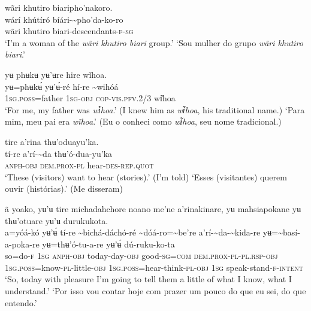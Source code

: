 \documentclass[output=paper,
modfonts,nonflat
]{langsci/langscibook}
\begin{document}
\ea wãri khutiro biaripho'nakoro. \\[.3em]
\gll {\textasciitilde}wárí khútíró bíári-{\textasciitilde}pho'da-ko-ro \\
     wãri khutiro biari-descendants\textsc{-f-sg} \\
\glt ‘I'm a woman of the \textit{wãri khutiro biari} group.’
\glt ‘Sou mulher do grupo \textit{wãri khutiro biari}.’
\z 

\ea yʉ phʉkʉ yʉ’ʉre hire wĩhoa. \\[.3em]
\gll yʉ=phʉkʉ́	yʉ’ʉ́-ré	hí-re	{\textasciitilde}wihóá\\
     1\textsc{sg.poss}=father	1\textsc{sg}\textsc{-obj}  	\textsc{cop-}\textsc{vis.pfv.}2/3	wi͂hoa \\
\glt ‘For me, my father was \textit{wi͂hoa}.’ (I knew him as \textit{wi͂hoa}, his traditional name.)
\glt ‘Para mim, meu pai era \textit{wĩhoa}.’ (Eu o conheci como \textit{wi͂hoa}, seu nome tradicional.)
\z 
 
\ea tire a’rina thʉ'oduayu'ka. \\[.3em]
\gll tí-re	a’rí-{\textasciitilde}da	thʉ'ó-dua-yu'ka \\
     \textsc{anph-obj}  	\textsc{dem.prox-pl}	hear-\textsc{des-rep.quot} \\
\glt ‘These (visitors) want to hear (stories).’ (I’m told)
\glt ‘Esses (visitantes) querem ouvir (histórias).’ (Me disseram)
\z 

\ea ã yoako, yʉ’ʉ tire michadahchore noano me'ne a’rinakinare, yʉ mahsiapokane yʉ thʉ'otuare yʉ’ʉ durukukota. \\[.3em]
\gll {\textasciitilde}a=yóá-kó	yʉ’ʉ́	tí-re	{\textasciitilde}bichá-dáchó-ré	{\textasciitilde}dóá-ro={\textasciitilde}be're	a’rí-{\textasciitilde}da-{\textasciitilde}kida-re yʉ={\textasciitilde}basí-a-poka-re	yʉ=thʉ'ó-tu-a-re	yʉ’ʉ́	dú-ruku{\footnotemark}-ko-ta \\
     so=do-\textsc{f}	1\textsc{sg}	\textsc{anph-obj}  	today-day\textsc{-obj}  	good\textsc{-sg=com}	\textsc{dem.prox-pl-pl.rsp-obj} 1\textsc{sg.poss}=know-\textsc{pl}-little-\textsc{obj}  	1\textsc{sg.poss}=hear-think\textsc{-pl-obj}  	1\textsc{sg}	speak-stand-\textsc{f-intent} \\
\glt ‘So, today with pleasure I'm going to tell them a little of what I know, what I understand.’
\glt ‘Por isso vou contar hoje com prazer um pouco do que eu sei, do que entendo.’
\z
\end{document}
